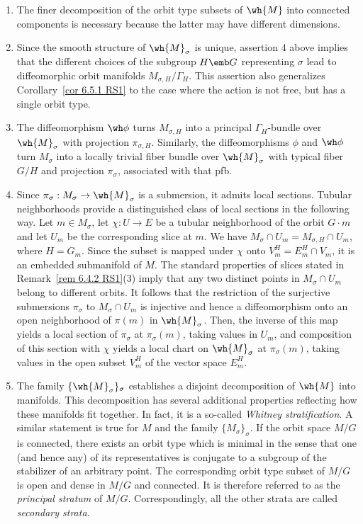 \begin{rem}[{{\cite[Rem.~6.6.2]{RS1}}}]
    \begin{enumerate}
        \item The finer decomposition of the orbit type subsets of $\wh{M}$ into connected components is necessary because the latter may have different dimensions.
        \item Since the smooth structure of $\wh{M}_\sigma$ is unique, assertion 4 above implies that the different choices of the subgroup $H\emb G$ representing $\sigma$ lead to diffeomorphic orbit manifolds $M_{\sigma,H}\slash\Gamma_H$. This assertion also generalizes Corollary~\ref{cor 6.5.1 RS1} to the case where the action is not free, but has a single orbit type.
        \item The diffeomorphism $\wh\phi$ turns $M_{\sigma,H}$ into a principal $\Gamma_H$-bundle over $\wh{M}_\sigma$ with projection $\pi_{\sigma,H}$. Similarly, the diffeomorphisms $\phi$ and $\wh\phi$ turn $M_\sigma$ into a locally trivial fiber bundle over $\wh{M}_\sigma$ with typical fiber $G\slash H$ and projection $\pi_\sigma$, associated with that \gls{pfb}.
        \item Since $\pi_\sigma:M_\sigma\to\wh{M}_\sigma$ is a submersion, it admits local sections. Tubular neighborhoods provide a distinguished class of local sections in the following way. Let $m\in M_\sigma$, let $\chi:U\to E$ be a tubular neighborhood of the orbit $G\cdot m$ and let $U_m$ be the corresponding slice at $m$. We have $M_\sigma\cap U_m=M_{\sigma,H}\cap U_m$, where $H=G_m$. Since the subset is mapped under $\chi$ onto $V_m^H=E_m^H\cap V_m$, it is an embedded submanifold of $M$. The standard properties of slices stated in Remark~\ref{rem 6.4.2 RS1}(3) imply that any two distinct points in $M_\sigma\cap U_m$ belong to different orbits. It follows that the restriction of the surjective submersions $\pi_\sigma$ to $M_\sigma\cap U_m$ is injective and hence a diffeomorphism onto an open neighborhood of $\pi(m)$ in $\wh{M}_\sigma$. Then, the inverse of this map yields a local section of $\pi_\sigma$ at $\pi_\sigma(m)$, taking values in $U_m$, and composition of this section with $\chi$ yields a local chart on $\wh{M}_\sigma$ at $\pi_\sigma(m)$, taking values in the open subset $V^H_m$ of the vector space $E_m^H$.
        \item The family $\{\wh{M}_\sigma\}_\sigma$ establishes a disjoint decomposition of $\wh{M}$ into manifolds. This decomposition has several additional properties reflecting how these manifolds fit together. In fact, it is a so-called \emph{Whitney stratification}. A similar statement is true for $M$ and the family $\{M_\sigma\}_\sigma$. If the orbit space $M\slash G$ is connected, there exists an orbit type which is minimal in the sense that one (and hence any) of its representatives is conjugate  to a subgroup of the stabilizer of an arbitrary point. The corresponding orbit type subset of $M\slash G$ is open and dense in $M\slash G$ and connected. It is therefore referred to as the \emph{principal stratum} of $M\slash G$. Correspondingly, all the other strata are called \emph{secondary strata}.
    \end{enumerate}
\end{rem}

